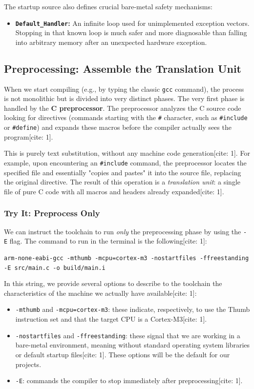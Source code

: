 The startup source also defines crucial bare-metal safety mechanisms:
\begin{itemize}
    \item \textbf{\texttt{Default\_Handler}:} An infinite loop used for unimplemented exception vectors. Stopping in that known loop is much safer and more diagnosable than falling into arbitrary memory after an unexpected hardware exception.
\end{itemize}

\subsection{Preprocessing: Assemble the Translation Unit}
When we start compiling (e.g., by typing the classic \texttt{gcc} command), the process is not monolithic but is divided into very distinct phases. The very first phase is handled by the \textbf{C preprocessor}. 
The preprocessor analyzes the C source code looking for directives (commands starting with the \texttt{\#} character, such as \texttt{\#include} or \texttt{\#define}) and expands these macros before the compiler actually sees the program[cite: 1]. 

This is purely text substitution, without any machine code generation[cite: 1]. For example, upon encountering an \texttt{\#include} command, the preprocessor locates the specified file and essentially "copies and pastes" it into the source file, replacing the original directive.
The result of this operation is a \textit{translation unit}: a single file of pure C code with all macros and headers already expanded[cite: 1].

\subsubsection{Try It: Preprocess Only}
We can instruct the toolchain to run \textit{only} the preprocessing phase by using the \texttt{-E} flag. The command to run in the terminal is the following[cite: 1]:

\texttt{arm-none-eabi-gcc -mthumb -mcpu=cortex-m3 -nostartfiles -ffreestanding -E src/main.c -o build/main.i}

In this string, we provide several options to describe to the toolchain the characteristics of the machine we actually have available[cite: 1]:
\begin{itemize}
    \item \texttt{-mthumb} and \texttt{-mcpu=cortex-m3}: these indicate, respectively, to use the Thumb instruction set and that the target CPU is a Cortex-M3[cite: 1].
    \item \texttt{-nostartfiles} and \texttt{-ffreestanding}: these signal that we are working in a bare-metal environment, meaning without standard operating system libraries or default startup files[cite: 1]. These options will be the default for our projects.
    \item \texttt{-E}: commands the compiler to stop immediately after preprocessing[cite: 1].
\end{itemize}

